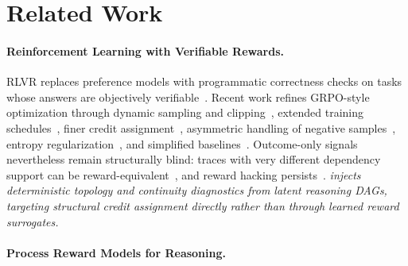 \section{Related Work}
\label{sec:related_work}

\paragraph{Reinforcement Learning with Verifiable Rewards.}
RLVR replaces preference models with programmatic correctness checks on tasks whose answers are objectively verifiable~\citep{shao2024deepseekmath,deepseekr1,lambert2024tulu3,zeng2503simplerlzoo}. 
Recent work refines GRPO-style optimization through dynamic sampling and clipping~\citep{yu2025dapo}, extended training schedules~\citep{liu2025prorl}, finer credit assignment~\citep{kazemnejad2025vineppo}, asymmetric handling of negative samples~\citep{zhu2025negsample}, entropy regularization~\citep{cui2025entropy}, and simplified baselines~\citep{ahmadian2024back,hu2025reinforce++}. Outcome-only signals nevertheless remain structurally blind: traces with very different dependency support can be reward-equivalent~\citep{chen2026does}, and reward hacking persists~\citep{gao2023scaling,skalse2022defining}. \textit{\method injects deterministic topology and continuity diagnostics from latent reasoning DAGs, targeting structural credit assignment directly rather than through learned reward surrogates.}

\paragraph{Process Reward Models for Reasoning.}

